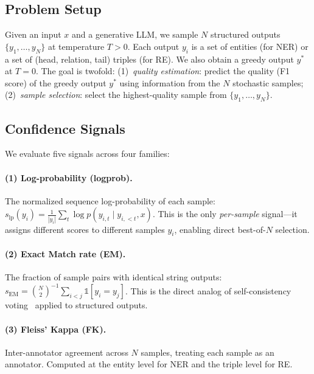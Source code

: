 \documentclass[11pt,a4paper]{article}
\begin{document}
\subsection{Problem Setup}

Given an input $x$ and a generative LLM, we sample $N$ structured outputs $\{y_1, \ldots, y_N\}$ at temperature $T{>}0$.
Each output $y_i$ is a set of entities (for NER) or a set of (head, relation, tail) triples (for RE).
We also obtain a greedy output $y^*$ at $T{=}0$.
The goal is twofold: (1)~\emph{quality estimation}: predict the quality (F1 score) of the greedy output $y^*$ using information from the $N$ stochastic samples; (2)~\emph{sample selection}: select the highest-quality sample from $\{y_1, \ldots, y_N\}$.

\subsection{Confidence Signals}

We evaluate five signals across four families:

\paragraph{(1) Log-probability (logprob).}
The normalized sequence log-probability of each sample: $s_{\text{lp}}(y_i) = \frac{1}{|y_i|}\sum_{t} \log p(y_{i,t} \mid y_{i,<t}, x)$.
This is the only \emph{per-sample} signal---it assigns different scores to different samples $y_i$, enabling direct best-of-$N$ selection.

\paragraph{(2) Exact Match rate (EM).}
The fraction of sample pairs with identical string outputs: $s_{\text{EM}} = \binom{N}{2}^{-1} \sum_{i<j} \mathbb{1}[y_i = y_j]$.
This is the direct analog of self-consistency voting~\cite{wang2023selfconsistency} applied to structured outputs.

\paragraph{(3) Fleiss' Kappa (FK).}
Inter-annotator agreement across $N$ samples, treating each sample as an annotator. Computed at the entity level for NER and the triple level for RE.
\end{document}

